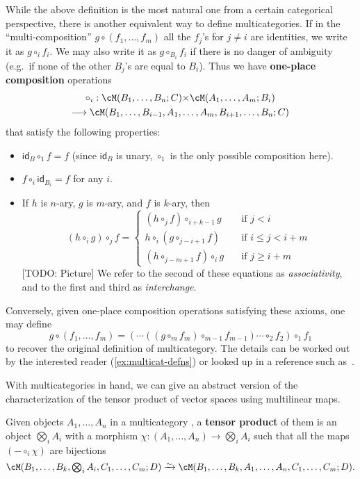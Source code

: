 \documentclass{book}
\def\idfunc{\mathsf{id}}
\let\bigtensor\bigotimes
\begin{document}
While the above definition is the most natural one from a certain categorical perspective, there is another equivalent way to define multicategories.
If in the ``multi-composition'' $g\circ (f_1,\dots,f_m)$ all the $f_j$'s for $j\neq i$ are identities, we write it as $g \circ_i f_i$.
We may also write it as $g\circ_{B_i} f_i$ if there is no danger of ambiguity (e.g.\ if none of the other $B_j$'s are equal to $B_i$).
Thus we have \textbf{one-place composition} operations
\begin{multline*}
  \circ_i : \cM(B_1,\dots,B_n;C) \times \cM(A_1,\dots,A_m;B_i) \\
  \too \cM(B_1,\dots,B_{i-1},A_1,\dots,A_m,B_{i+1},\dots,B_n;C)
\end{multline*}
that satisfy the following properties:
\begin{itemize}
\item $\idfunc_B \circ_1 f = f$ (since $\idfunc_B$ is unary, $\circ_1$ is the only possible composition here).
\item $f\circ_i \idfunc_{B_i} = f$ for any $i$.
\item If $h$ is $n$-ary, $g$ is $m$-ary, and $f$ is $k$-ary, then
  \[ (h \circ_i g) \circ_{j} f=
  \begin{cases}
    (h\circ_j f)\circ_{i+k-1} g &\quad \text{if } j < i\\
    h\circ_i (g\circ_{j-i+1} f) &\quad \text{if } i \le j < i+m\\
    (h\circ_{j-m+1} f)\circ_{i} g &\quad \text{if } j \ge i+m
  \end{cases}
  \]
  [TODO: Picture]
  We refer to the second of these equations as \emph{associativity}, and to the first and third as \emph{interchange}.
\end{itemize}
Conversely, given one-place composition operations satisfying these axioms, one may define
\[ g\circ (f_1,\dots,f_m) = (\cdots((g \circ_m f_m) \circ_{m-1} f_{m-1}) \cdots \circ_2 f_2) \circ_1 f_1 \]
to recover the original definition of multicategory.
The details can be worked out by the interested reader (\cref{ex:multicat-defns}) or looked up in a reference such as~\cite{leinster:higher-opds}.

With multicategories in hand, we can give an abstract version of the characterization of the tensor product of vector spaces using multilinear maps.

\begin{defn}\label{defn:multicat-tensor}
  Given objects $A_1,\dots,A_n$ in a multicategory \cM, a \textbf{tensor product} of them is an object $\bigtensor_i A_i$ with a morphism $\chi:(A_1,\dots,A_n) \to \bigtensor_i A_i$ such that all the maps $(-\circ_i \chi)$ are bijections
  \[ \cM(B_1,\dots,B_k,\textstyle\bigtensor_i A_i,C_1,\dots,C_m;D) \toiso \cM(B_1,\dots,B_k,A_1,\dots,A_n,C_1,\dots,C_m;D). \]
\end{defn}
\end{document}
